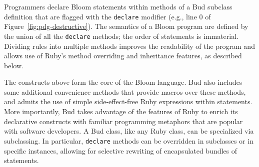 Programmers declare Bloom statements within methods of a Bud subclass definition
that are flagged with the \texttt{declare} modifier (e.g., line 0 of
Figure~\ref{fig:pdg-destructive}). The semantics of a Bloom program are defined
by the union of all the \texttt{declare} methods; the order of statements is
immaterial. Dividing rules into multiple methods improves the readability of the
program and allows use of Ruby's method overriding and inheritance features, as described below.


The constructs above form the core of the Bloom language.
Bud also includes some additional convenience methods that provide macros over these methods, and admits the use of simple side-effect-free Ruby expressions within statements.  More importantly, Bud takes advantage of the features of Ruby to enrich its declarative constructs with familiar programming metaphors that are popular with software developers.  A Bud class, like any Ruby class, can be specialized via subclassing.  In particular, \texttt{declare} methods can be overridden in subclasses or in specific instances, allowing for selective rewriting of encapsulated bundles of statements.%

\begin{comment}
Conventional wisdom in certain quarters says that rule-based languages are untenable for large programs that evolve over time, since the interactions among rules become too difficult to understand.  We believe this concern is an artifact of early rule languages that mixed apparently declarative syntax with imperative constructs and assumptions.  In fact, we demonstrate below that the pure logic-programming roots of Bloom can allow programmers to reason about many program interactions in a much deeper way than traditional imperative languages.
\end{comment}

